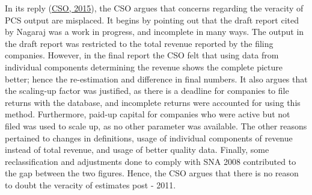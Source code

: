 \documentclass[12pt,nobind, a4paper]{reedthesis}
\begin{document}
 In its reply (\protect\hyperlink{ref-cso_no_2015}{CSO, 2015}), the CSO argues that concerns regarding the veracity of PCS output are misplaced. It begins by pointing out that the draft report cited by Nagaraj was a work in progress, and incomplete in many ways. The output in the draft report was restricted to the total revenue reported by the filing companies. However, in the final report the CSO felt that using data from individual components determining the revenue shows the complete picture better; hence the re-estimation and difference in final numbers. It also argues that the scaling-up factor was justified, as there is a deadline for companies to file returns with the database, and incomplete returns were accounted for using this method. Furthermore, paid-up capital for companies who were active but not filed was used to scale up, as no other parameter was available. The other reasons pertained to changes in definitions, usage of individual components of revenue instead of total revenue, and usage of better quality data. Finally, some reclassification and adjustments done to comply with SNA 2008 contributed to the gap between the two figures. Hence, the CSO argues that there is no reason to doubt the veracity of estimates post - 2011.
 \linebreak
\end{document}
